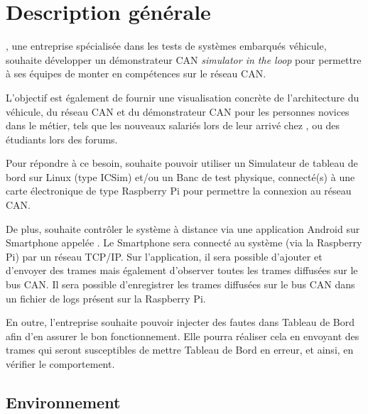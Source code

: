 \section{Description générale} %

{\client}, une entreprise spécialisée dans les tests de systèmes embarqués véhicule, souhaite développer un démonstrateur CAN \textit{simulator in the loop} pour permettre à ses équipes de monter en compétences sur le réseau CAN. 

\vspace{\baselineskip} %
L'objectif est également de fournir une visualisation concrète de l'architecture du véhicule, du réseau CAN et du démonstrateur CAN pour les personnes novices dans le métier, tels que les nouveaux salariés lors de leur arrivé chez {\client}, ou des étudiants lors des forums. 

\vspace{\baselineskip} %
Pour répondre à ce besoin, {\client} souhaite pouvoir utiliser un Simulateur de tableau de bord sur Linux (type ICSim) et/ou un Banc de test physique, connecté(s) à une carte électronique de type Raspberry Pi pour permettre la connexion au réseau CAN. 

\vspace{\baselineskip} %
De plus, {\client} souhaite contrôler le système à distance via une application Android sur Smartphone appelée {\nomApplication}. Le Smartphone sera connecté au système (via la Raspberry Pi) par un réseau TCP/IP. Sur l'application, il sera possible d'ajouter et  d'envoyer des trames mais également d'observer toutes les trames diffusées sur le bus CAN. Il sera possible d'enregistrer les trames diffusées sur le bus CAN dans un fichier de logs présent sur la Raspberry Pi.

\vspace{\baselineskip} %
En outre, l'entreprise souhaite pouvoir injecter des fautes dans Tableau de Bord afin d'en assurer le bon fonctionnement. Elle pourra réaliser cela en envoyant des trames qui seront susceptibles de mettre Tableau de Bord en erreur, et ainsi, en vérifier le comportement.



\subsection{Environnement}

